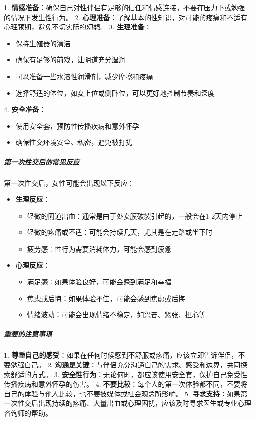 \documentclass[12pt,UTF8]{ctexbook}
\begin{document}
1. \textbf{情感准备}：确保自己对性伴侣有足够的信任和情感连接，不要在压力下或勉强的情况下发生性行为。
2. \textbf{心理准备}：了解基本的性知识，对可能的疼痛和不适有心理预期，避免不切实际的幻想。
3. \textbf{生理准备}：
  \begin{itemize}
  \item 保持生殖器的清洁
  \item 确保有足够的前戏，让阴道充分湿润
  \item 可以准备一些水溶性润滑剂，减少摩擦和疼痛
  \item 选择舒适的体位，如女上位或侧卧位，可以更好地控制节奏和深度
  \end{itemize}
4. \textbf{安全准备}：
  \begin{itemize}
  \item 使用安全套，预防性传播疾病和意外怀孕
  \item 确保性交环境安全、私密，避免被打扰
  \end{itemize}

\subparagraph{第一次性交后的常见反应}

第一次性交后，女性可能会出现以下反应：

\begin{itemize}
\item \textbf{生理反应}：
  \begin{itemize}
  \item 轻微的阴道出血：通常是由于处女膜破裂引起的，一般会在1-2天内停止
  \item 轻微的疼痛或不适：可能会持续几天，尤其是在走路或坐下时
  \item 疲劳感：性行为需要消耗体力，可能会感到疲惫
  \end{itemize}
\item \textbf{心理反应}：
  \begin{itemize}
  \item 满足感：如果体验良好，可能会感到满足和幸福
  \item 焦虑或后悔：如果体验不佳，可能会感到焦虑或后悔
  \item 情绪波动：可能会出现情绪不稳定，如兴奋、紧张、担心等
  \end{itemize}
\end{itemize}

\subparagraph{重要的注意事项}

1. \textbf{尊重自己的感受}：如果在任何时候感到不舒服或疼痛，应该立即告诉伴侣，不要勉强自己。
2. \textbf{沟通是关键}：与伴侣充分沟通自己的需求、感受和边界，共同探索舒适的方式。
3. \textbf{安全性行为}：无论何时，都应该使用安全套，保护自己免受性传播疾病和意外怀孕的伤害。
4. \textbf{不要比较}：每个人的第一次体验都不同，不要将自己的体验与他人比较，也不要被媒体或社会观念所影响。
5. \textbf{寻求支持}：如果第一次性交后出现持续的疼痛、大量出血或心理困扰，应该及时寻求医生或专业心理咨询师的帮助。
\end{document}
